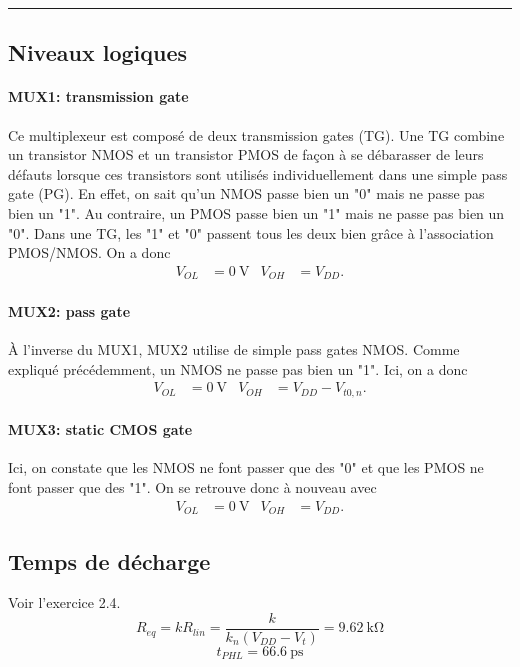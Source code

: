 \documentclass[frenchb,DIV=14]{scrartcl}
\begin{document}
\hspace{1cm}\hrule

\subsection*{Niveaux logiques}
\paragraph{MUX1: transmission gate} 
Ce multiplexeur est composé de deux transmission gates (TG).
Une TG combine un transistor NMOS et un transistor PMOS de façon à se débarasser
de leurs défauts lorsque ces transistors sont utilisés individuellement dans une
simple pass gate (PG). En effet, on sait qu'un NMOS passe bien un "0" mais ne passe
pas bien un "1". Au contraire, un PMOS passe bien un "1" mais ne passe pas bien un "0".
Dans une TG, les "1" et "0" passent tous les deux bien grâce à l'association PMOS/NMOS.
On a donc
\begin{align*}
	V_{OL} &= \SI{0}{\volt} & V_{OH} &= V_{DD}.
\end{align*}

\paragraph{MUX2: pass gate} 
\`{A} l'inverse du MUX1, MUX2 utilise de simple pass gates NMOS.
Comme expliqué précédemment, un NMOS ne passe pas bien un "1". Ici, on a donc
\begin{align*}
	V_{OL} &= \SI{0}{\volt} & V_{OH} &= V_{DD}-V_{t0,n}.
\end{align*}

\paragraph{MUX3: static CMOS gate}
Ici, on constate que les NMOS ne font passer que des "0" et que les PMOS ne
font passer que des "1". On se retrouve donc à nouveau avec
\begin{align*}
	V_{OL} &= \SI{0}{\volt} & V_{OH} &= V_{DD}.
\end{align*}

\subsection*{Temps de décharge}
Voir l'exercice 2.4.
\[R_{eq} = k R_{lin} = \frac{k}{k_n (V_{DD} - V_t)} = \SI{9.62}{\kilo\ohm} \]
\[t_{PHL} = \SI{66.6}{\pico\second} \]
\end{document}
